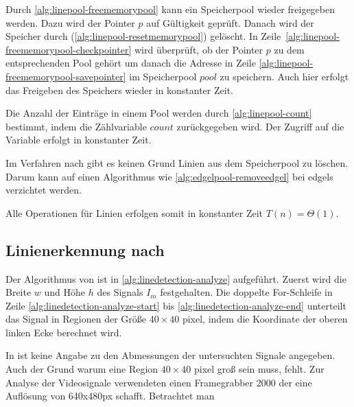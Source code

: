 

Durch \autoref{alg:linepool-freememorypool} kann ein Speicherpool wieder freigegeben werden. Dazu wird der Pointer $p$
 auf Gültigkeit geprüft. Danach wird der Speicher durch 
 (\autoref{alg:linepool-resetmemorypool}) gelöscht. In Zeile~\ref{alg:linepool-freememorypool-checkpointer} wird
 überprüft, ob der Pointer $p$ zu dem entsprechenden Pool gehört um danach die Adresse in Zeile
 \ref{alg:linepool-freememorypool-savepointer} im Speicherpool $\mathit{pool}$ zu speichern. Auch hier erfolgt das
 Freigeben des Speichers wieder in konstanter Zeit.



Die Anzahl der Einträge in einem Pool werden durch \autoref{alg:linepool-count} bestimmt, indem die Zählvariable
 $\mathit{count}$ zurückgegeben wird. Der Zugriff auf die Variable erfolgt in konstanter Zeit.



Im Verfahren nach \citeauthor{clarke96} gibt es keinen Grund Linien aus dem Speicherpool zu löschen. Darum kann auf
 einen Algorithmus wie \autoref{alg:edgelpool-removeedgel} bei \glspl{edgel} verzichtet werden.

Alle Operationen für Linien erfolgen somit in konstanter Zeit $T(n) = \Theta(1)$.


\subsection{Linienerkennung nach \citeauthor{clarke96}} %
\label{sub:linienerkennung_nach_clarke96}

Der Algorithmus von \citeauthor{clarke96} ist in \autoref{alg:linedetection-analyze} aufgeführt. Zuerst wird die Breite
 $w$ und Höhe $h$ des Signals $I_m$ festgehalten. Die doppelte For-Schleife in Zeile
 \ref{alg:linedetection-analyze-start} bis \ref{alg:linedetection-analyze-end} unterteilt das Signal in Regionen der
 Größe $40 \times 40$ \gls{pixel}, indem die Koordinate der oberen linken Ecke berechnet wird.



In \citeauthor{clarke96} ist keine Angabe zu den Abmessungen der untersuchten Signale angegeben. Auch der Grund warum
 eine Region $40 \times 40$ \gls{pixel} groß sein muss, fehlt. Zur Analyse der Videosignale verwendeten
 \citeauthor{clarke96} einen Framegrabber 2000 der eine Auflösung von 640x480px schafft. Betrachtet man

